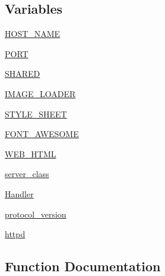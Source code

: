 \subsection*{Variables}
\begin{DoxyCompactItemize}
\item 
\hyperlink{namespaceprojects_1_1personality__captions_1_1interactive_a9ced4af3bcb3aa0d1bc814cef710e6d9}{H\+O\+S\+T\+\_\+\+N\+A\+ME}
\item 
\hyperlink{namespaceprojects_1_1personality__captions_1_1interactive_aea2e29df65dc732ad104f5a244fea7a3}{P\+O\+RT}
\item 
\hyperlink{namespaceprojects_1_1personality__captions_1_1interactive_a39fae192ae72a7175a071c6f5fbe4eb8}{S\+H\+A\+R\+ED}
\item 
\hyperlink{namespaceprojects_1_1personality__captions_1_1interactive_a0cfa01e7e0553d70c9040b1ba3a5ab4c}{I\+M\+A\+G\+E\+\_\+\+L\+O\+A\+D\+ER}
\item 
\hyperlink{namespaceprojects_1_1personality__captions_1_1interactive_abfbad8eff0a52080f180b9d814910890}{S\+T\+Y\+L\+E\+\_\+\+S\+H\+E\+ET}
\item 
\hyperlink{namespaceprojects_1_1personality__captions_1_1interactive_a89a5a76ae43a3c1df28800762ac5140a}{F\+O\+N\+T\+\_\+\+A\+W\+E\+S\+O\+ME}
\item 
\hyperlink{namespaceprojects_1_1personality__captions_1_1interactive_a7c3681f36fedf5261f17a50a4cf58b2d}{W\+E\+B\+\_\+\+H\+T\+ML}
\item 
\hyperlink{namespaceprojects_1_1personality__captions_1_1interactive_addcc3c9fe5ea6cea1c27b25747212851}{server\+\_\+class}
\item 
\hyperlink{namespaceprojects_1_1personality__captions_1_1interactive_ae24fa5ef9665f775352eac9d6968713e}{Handler}
\item 
\hyperlink{namespaceprojects_1_1personality__captions_1_1interactive_aa1635234971b329d90a80ccbf388c3c3}{protocol\+\_\+version}
\item 
\hyperlink{namespaceprojects_1_1personality__captions_1_1interactive_ae631e34db5e50d6236da3b5b85427076}{httpd}
\end{DoxyCompactItemize}


\subsection{Function Documentation}
\mbox{\label{namespaceprojects_1_1personality__captions_1_1interactive_aa5144adf4092cfa1c2dc076d766226a1}} 
